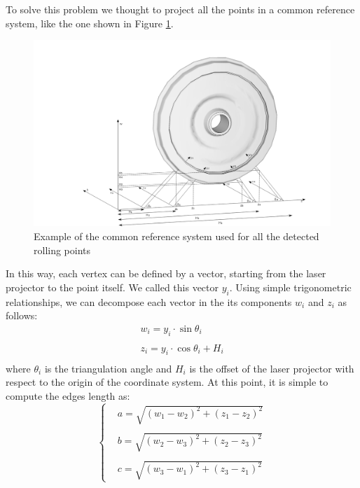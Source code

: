 To solve this problem we thought to project all the points in a common reference system, like the one shown in Figure \ref{fig:common-rs}.
  \begin{figure}[t!]
    \centering
    \includegraphics[width=\textwidth]{./images/wpms/diam_rs.png}
    \caption{Example of the common reference system used for all the detected rolling points}
    \label{fig:common-rs}
  \end{figure}
In this way, each vertex can be defined by a vector, starting from the laser projector to the point itself. We called this vector $y_i$. Using simple trigonometric relationships, we can decompose each vector in the its components $w_i$ and $z_i$ as follows:
  \begin{equation}
    \begin{matrix}
      w_i = y_i \cdot \sin \theta_i \\ \\
      z_i = y_i \cdot \cos \theta_i + H_i \\
    \end{matrix}
    \label{eq:components}
  \end{equation}
where $\theta_i$ is the triangulation angle and $H_i$ is the offset of the laser projector with respect to the origin of the coordinate system. At this point, it is simple to compute the edges length as:
  \begin{equation}
    \left\{
    \begin{matrix} 
      & a = \sqrt{(w_1 - w_2)^2 + (z_1 - z_2)^2} \\ \\
      & b = \sqrt{(w_2 - w_3)^2 + (z_2 - z_3)^2} \\ \\
      & c = \sqrt{(w_3 - w_1)^2 + (z_3 - z_1)^2}
    \end{matrix}
    \right.
    \label{eq:edges-len}
  \end{equation} \\
